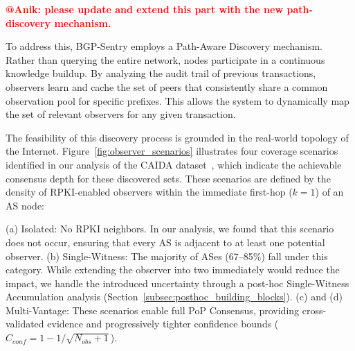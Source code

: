 \documentclass[conference]{IEEEtran}
\newcommand{\rj}[1]{{\color{blue}#1}}
\newcommand{\md}[1]{{\color{purple}#1}}
\begin{document}
\textcolor{red}{\textbf{@Anik: please update and extend this part with the new path-discovery mechanism.}}

To address this, BGP-Sentry employs a Path-Aware Discovery mechanism. Rather than querying the entire network, nodes participate in a continuous knowledge buildup. By analyzing the audit trail of previous transactions, observers learn and cache the set of peers that consistently share a common observation pool for specific prefixes. This allows the system to dynamically map the set of relevant observers for any given transaction.

The feasibility of this discovery process is grounded in the real-world topology of the Internet. Figure~\ref{fig:observer_scenarios} illustrates four coverage scenarios identified in our analysis of the CAIDA dataset~\cite{caida-dataset}, which indicate the achievable consensus depth for these discovered sets. These scenarios are defined by the density of RPKI-enabled observers within the immediate first-hop ($k=1$) of an AS node:

(a) Isolated: No RPKI neighbors. In our analysis, we found that this scenario does not occur, ensuring that every AS is adjacent to at least one potential observer. (b) Single-Witness: The majority of ASes (67--85\%) fall under this category. While extending the observer into two immediately would reduce the impact, we handle the introduced uncertainty through a post-hoc Single-Witness Accumulation analysis (Section~\ref{subsec:posthoc_building_blocks}). (c) and (d) Multi-Vantage: These scenarios enable full PoP Consensus, providing cross-validated evidence and progressively tighter confidence bounds ($C_{conf} = 1 - 1/\sqrt{N_{obs} + 1}$).


\end{document}
